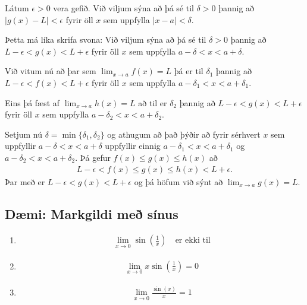 \documentclass[b5paper,10pt,icelandic]{sphinxmanual}
\begin{document}

Látum \(\epsilon>0\) vera gefið. Við viljum sýna að þá sé til \(\delta>0\) þannig
að \(|g(x)-L|<\epsilon\) fyrir öll \(x\) sem uppfylla \(|x-a|<\delta\).

Þetta má líka skrifa svona:
Við viljum sýna að þá sé til \(\delta>0\) þannig
að \(L-\epsilon<g(x)<L+\epsilon\) fyrir öll \(x\) sem uppfylla \(a-\delta < x<a+\delta\).

Við vitum nú að þar sem \(\lim_{x\to a} f(x) = L\) þá er til \(\delta_1\)
þannig að \(L-\epsilon<f(x)<L+\epsilon\) fyrir öll \(x\) sem uppfylla \(a-\delta_1 < x<a+\delta_1\).

Eins þá fæst af \(\lim_{x\to a} h(x) = L\) að til er \(\delta_2\)
þannig að \(L-\epsilon<g(x)<L+\epsilon\) fyrir öll \(x\) sem uppfylla \(a-\delta_2 < x<a+\delta_2\).

Setjum nú \(\delta = \min\{\delta_1,\delta_2\}\) og athugum að það þýðir að fyrir sérhvert \(x\) sem
uppfyllir \(a-\delta < x < a+\delta\) uppfyllir einnig \(a-\delta_1 < x<a+\delta_1\)
og \(a-\delta_2 < x<a+\delta_2\). Þá gefur \(f(x)\leq g(x)\leq h(x)\) að
\begin{equation*}
\begin{split}L-\epsilon<f(x) \leq g(x) \leq h(x) < L+\epsilon.\end{split}
\end{equation*}
Þar með er \(L-\epsilon < g(x) < L+\epsilon\) og þá höfum við sýnt að
\(\lim_{x\to a} g(x) = L\).


\subsection{Dæmi: Markgildi með sínus}
\label{\detokenize{kafli02:daemi-markgildi-me-sinus}}\begin{enumerate}
\item {} \begin{equation*}
\begin{split}\lim_{x\to 0} \sin\left(\frac 1x\right) \quad \text{er ekki til}\end{split}
\end{equation*}
\item {} \begin{equation*}
\begin{split}\lim_{x\to 0} x\sin\left(\frac 1x\right) = 0\end{split}
\end{equation*}
\item {} \begin{equation*}
\begin{split}\lim_{x \to 0} \frac{\sin(x)}{x} = 1\end{split}
\end{equation*}
\end{enumerate}
\end{document}
